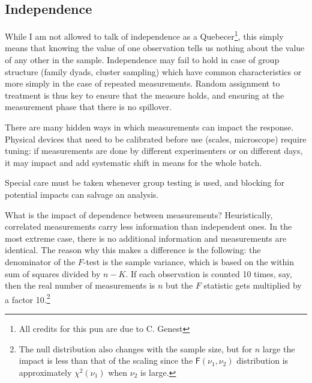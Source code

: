 \documentclass[
  11pt,
  letterpaper,
]{scrbook}
\theoremstyle{definition}
\theoremstyle{remark}
\begin{document}
\hypertarget{sec-modelassumptionsindependence}{%
\subsection{Independence}\label{sec-modelassumptionsindependence}}

While I am not allowed to talk of independence as a Quebecer\footnote{All
  credits for this pun are due to C. Genest}, this simply means that
knowing the value of one observation tells us nothing about the value of
any other in the sample. Independence may fail to hold in case of group
structure (family dyads, cluster sampling) which have common
characteristics or more simply in the case of repeated measurements.
Random assignment to treatment is thus key to ensure that the measure
holds, and ensuring at the measurement phase that there is no spillover.

There are many hidden ways in which measurements can impact the
response. Physical devices that need to be calibrated before use
(scales, microscope) require tuning: if measurements are done by
different experimenters or on different days, it may impact and add
systematic shift in means for the whole batch.

Special care must be taken whenever group testing is used, and blocking
for potential impacts can salvage an analysis.

What is the impact of dependence between measurements? Heuristically,
correlated measurements carry less information than independent ones. In
the most extreme case, there is no additional information and
measurements are identical. The reason why this makes a difference is
the following: the denominator of the \(F\)-test is the sample variance,
which is based on the within sum of squares divided by \(n-K\). If each
observation is counted 10 times, say, then the real number of
measurements is \(n\) but the \(F\) statistic gets multiplied by a
factor 10.\footnote{The null distribution also changes with the sample
  size, but for \(n\) large the impact is less than that of the scaling
  since the \(\mathsf{F}(\nu_1, \nu_2)\) distribution is approximately
  \(\chi^2(\nu_1)\) when \(\nu_2\) is large.}
\end{document}

